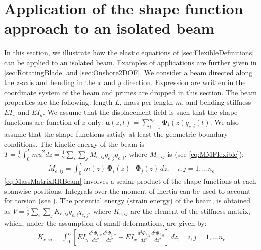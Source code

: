 \documentclass[wes, manuscript]{copernicus}
\renewcommand{\v}[1]{\boldsymbol{#1}}
\begin{document}
\section{Application of the shape function approach to an isolated beam}
\label{sec:ShapeFunctionApproachBeam}
In this section, we illustrate how the elastic equations of \autoref{sec:FlexibleDefinitions} can be applied to an isolated beam. 
Examples of applications are further given in \autoref{sec:RotatingBlade} and \autoref{sec:Onshore2DOF}.
We consider a beam directed along the $z$-axis and bending in the $x$ and $y$ direction.
Expression are written in the coordinate system of the beam and primes are dropped in this section.
The beam properties are the following: length $L$, mass per length $m$, and bending stiffness $EI_x$ and $EI_y$.
We assume that the displacement field is such that the shape functions are function of $z$ only:
  $  \v{u}(z,t) = \sum_{i=1}^{n_e} \v{\Phi}_i(z) q_{e,i}(t)$.
We also assume that the shape functions satisfy at least the geometric boundary conditions. 
% 
The kinetic energy of the beam is $T= \frac{1}{2}\int_0^L m \dot{u}^2 dz=\frac{1}{2}\sum_i\sum_j M_{e,ij} \dot{q}_{e,j}\dot{q}_{e,i}$.
where $M_{e,ij}$ is (see \autoref{eq:MMFlexible}):
\begin{align}
  M_{e,ij} = \int_0^L m(z)\, \v{\Phi}_i(z)\cdot \v{\Phi}_j(z)\,dz 
      ,\quad i,j=1,\ldots n_e
      \label{eq:MassMatrixRRBeam}
\end{align}
\autoref{eq:MassMatrixRRBeam} involves a scalar product of the shape functions at each spanwise positions.
    Integrals over the moment of inertia can be used to account for torsion (see \cite{branlard:2019flex}).
The potential energy (strain energy) of the beam, is obtained as $V=\frac{1}{2} \sum_i \sum_j K_{e,ij}q_{e,i} q_{e,j}$, where $K_{e,ij}$ are the element of the stiffness matrix, which, under the assumption of small deformations, are given by:
\begin{align}
    K_{e,ij} = \int_{0}^L \left[EI_y \frac{d^2 \Phi_{i,x}}{dz^2} \frac{d^2 \Phi_{j,x}}{dz^2} + EI_x \frac{d^2 \Phi_{i,y}}{dz^2} \frac{d^2 \Phi_{j,y}}{dz^2}\right] \, dz
      ,\quad i,j=1,\ldots n_e
      \label{eq:stiffnessMatrixRRBeam}
\end{align}
\end{document}
